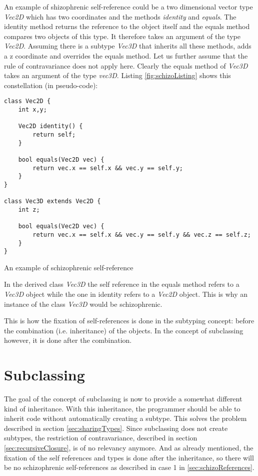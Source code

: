An example of shizophrenic self-reference could be a two dimensional
vector type \emph{Vec2D} which has two coordinates and the methods
\emph{identity} and \emph{equals}. The identity method returns the
reference to the object itself and the equals method compares two
objects of this type. It therefore takes an argument of the type
\emph{Vec2D}. Assuming there is a subtype \emph{Vec3D} that inherits
all these methods, adds a z coordinate and overrides the equals
method. Let us further assume that the rule of contravariance does not
apply here. Clearly the equals method of \emph{Vec3D} takes an argument
of the type \emph{vec3D}. Listing \ref{fig:schizoListing} shows this
constellation (in pseudo-code):

\begin{listing}[H]
\begin{lstlisting}
class Vec2D {
	int x,y;

	Vec2D identity() {
		return self;
	}

	bool equals(Vec2D vec) {
		return vec.x == self.x && vec.y == self.y;
	}
}

class Vec3D extends Vec2D {
	int z;

	bool equals(Vec2D vec) {
		return vec.x == self.x && vec.y == self.y && vec.z == self.z;
	}
}
\end{lstlisting}
\caption{An example of schizophrenic self-reference}
\label{fig:schizoListing}
\end{listing}

In the derived class \emph{Vec3D} the self reference in the equals 
method refers to a \emph{Vec3D} object while the one in identity
refers to a \emph{Vec2D} object. This is why an instance of the class
\emph{Vec3D} would be schizophrenic.

This is how the fixation of self-references is done in the subtyping
concept: before the combination (i.e. inheritance) of the objects. In the
concept of subclassing however, it is done after the combination.

\section{Subclassing}

The goal of the concept of subclassing is now to provide a somewhat
different kind of inheritance. With this inheritance, the programmer should
be able to inherit code without automatically creating a subtype. 
This solves the problem described in section \ref{sec:sharingTypes}. Since
subclassing does not create subtypes, the restriction of contravariance, 
described in section \ref{sec:recursiveClosure}, is of no relevancy
anymore. And as already mentioned, the fixation of the self
references and types is done after the inheritance, so there will be no
schizophrenic self-references as described in case 1 in 
\ref{sec:schizoReferences}. \\

